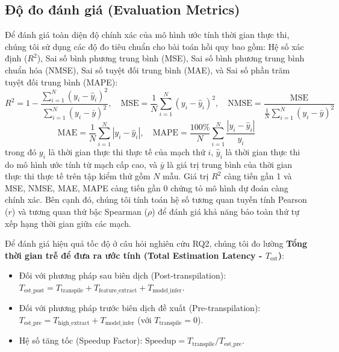 \documentclass[11pt, a4paper]{article}
\begin{document}
\subsection{Độ đo đánh giá (Evaluation Metrics)}
Để đánh giá toàn diện độ chính xác của mô hình ước tính thời gian thực thi, chúng tôi sử dụng các độ đo tiêu chuẩn cho bài toán hồi quy bao gồm: Hệ số xác định ($R^2$), Sai số bình phương trung bình (MSE), Sai số bình phương trung bình chuẩn hóa (NMSE), Sai số tuyệt đối trung bình (MAE), và Sai số phần trăm tuyệt đối trung bình (MAPE):
\begin{equation}
    R^2 = 1 - \frac{\sum_{i=1}^{N} (y_i - \hat{y}_i)^2}{\sum_{i=1}^{N} (y_i - \bar{y})^2}, \quad
    \text{MSE} = \frac{1}{N} \sum_{i=1}^{N} (y_i - \hat{y}_i)^2, \quad
    \text{NMSE} = \frac{\text{MSE}}{\frac{1}{N}\sum_{i=1}^{N} (y_i - \bar{y})^2}
\end{equation}
\begin{equation}
    \text{MAE} = \frac{1}{N}\sum_{i=1}^{N} |y_i - \hat{y}_i|, \quad
    \text{MAPE} = \frac{100\%}{N}\sum_{i=1}^{N} \frac{|y_i - \hat{y}_i|}{y_i}
\end{equation}
trong đó $y_i$ là thời gian thực thi thực tế của mạch thứ $i$, $\hat{y}_i$ là thời gian thực thi do mô hình ước tính từ mạch cấp cao, và $\bar{y}$ là giá trị trung bình của thời gian thực thi thực tế trên tập kiểm thử gồm $N$ mẫu. Giá trị $R^2$ càng tiến gần 1 và MSE, NMSE, MAE, MAPE càng tiến gần 0 chứng tỏ mô hình dự đoán càng chính xác. Bên cạnh đó, chúng tôi tính toán hệ số tương quan tuyến tính Pearson ($r$) và tương quan thứ bậc Spearman ($\rho$) để đánh giá khả năng bảo toàn thứ tự xếp hạng thời gian giữa các mạch.

Để đánh giá hiệu quả tốc độ ở câu hỏi nghiên cứu RQ2, chúng tôi đo lường \textbf{Tổng thời gian trễ để đưa ra ước tính (Total Estimation Latency - $T_{\text{est}}$)}:
\begin{itemize}
    \item Đối với phương pháp sau biên dịch (Post-transpilation): $T_{\text{est\_post}} = T_{\text{transpile}} + T_{\text{feature\_extract}} + T_{\text{model\_infer}}$.
    \item Đối với phương pháp trước biên dịch đề xuất (Pre-transpilation): $T_{\text{est\_pre}} = T_{\text{high\_extract}} + T_{\text{model\_infer}}$ (với $T_{\text{transpile}} = 0$).
    \item Hệ số tăng tốc (Speedup Factor): $\text{Speedup} = T_{\text{transpile}} / T_{\text{est\_pre}}$.
\end{itemize}
\end{document}
